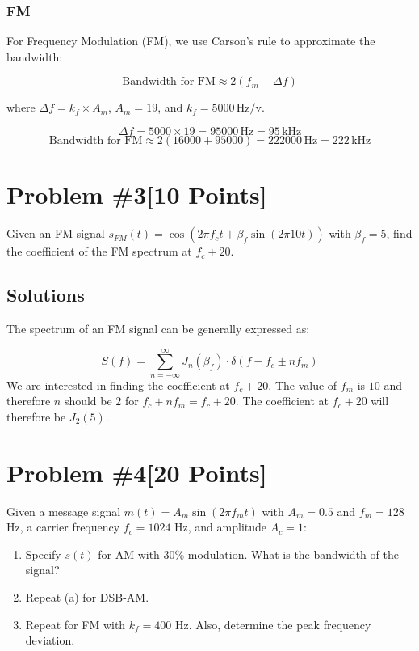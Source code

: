 \documentclass{article}
\begin{document}
\subsubsection*{FM}

For Frequency Modulation (FM), we use Carson's rule to approximate the bandwidth:

\[
\text{Bandwidth for FM} \approx 2 \left( f_m + \Delta f \right)
\]

where \( \Delta f = k_f \times A_m \), \( A_m = 19 \), and \( k_f = 5000 \, \text{Hz/v} \).

\[
\Delta f = 5000 \times 19 = 95000 \, \text{Hz} = 95 \, \text{kHz}
\]
\[
\text{Bandwidth for FM} \approx 2 \left( 16000 + 95000 \right) = 222000 \, \text{Hz} = 222 \, \text{kHz}
\]

\newpage
\section*{Problem \#3[10 Points]}
Given an FM signal \( s_{FM}(t) = \cos\left(2\pi f_c t + \beta_f \sin (2\pi 10 t)\right) \) with \( \beta_f = 5 \), find the coefficient of the FM spectrum at \( f_c + 20 \).

\subsection*{Solutions}

The spectrum of an FM signal can be generally expressed as:

\[
S(f) = \sum_{n=-\infty}^{\infty} J_n(\beta_f) \cdot \delta(f - f_c \pm n f_m)
\]
\newline
We are interested in finding the coefficient at \( f_c + 20 \). The value of \( f_m \) is \( 10 \) and therefore \( n \) should be \( 2 \) for \( f_c + n f_m = f_c + 20 \).
\newline\newline
The coefficient at \( f_c + 20 \) will therefore be \( J_2(5) \).


\newpage
\section*{Problem \#4[20 Points]}
Given a message signal \( m(t) = A_m \sin(2\pi f_m t) \) with \( A_m = 0.5 \) and \( f_m = 128 \) Hz, a carrier frequency \( f_c = 1024 \) Hz, and amplitude \( A_c = 1 \):

\begin{enumerate}
    \item Specify \( s(t) \) for AM with 30\% modulation. What is the bandwidth of the signal?
    \item Repeat (a) for DSB-AM.
    \item Repeat for FM with \( k_f = 400 \) Hz. Also, determine the peak frequency deviation.
\end{enumerate}
\end{document}
